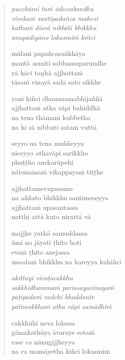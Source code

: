 

\cleartoverso

\vspace*{30mm}

\begin{verse}

\emph{pucchāmi taṁ ādiccabandhu\\
vivekaṁ santipadañca mahesi}\\
\emph{kathaṁ disvā nibbāti bhikkhu\\
anupādiyāno lokasmiṁ kiñci}

mūlaṁ papañcasaṅkhāya\\
mantā asmīti sabbamuparundhe\\
yā kāci taṇhā ajjhattaṁ\\
tāsaṁ vinayā sadā sato sikkhe

yaṁ kiñci dhammamabhijaññā\\
ajjhattaṁ atha vāpi bahiddhā\\
na tena thāmaṁ kubbetha\\
na hi sā nibbuti sataṁ vuttā

seyyo na tena maññeyya\\
nīceyyo athavāpi sarikkho\\
phuṭṭho anekarūpehi\\
nātumānaṁ vikappayaṁ tiṭṭhe

ajjhattamevupasame\\
na aññato bhikkhu santimeseyya\\
ajjhattaṁ upasantassa\\
natthi attā kuto nirattā vā

majjhe yathā samuddassa\\
ūmi no jāyatī ṭhito hoti\\
evaṁ ṭhito anejassa\\
ussadaṁ bhikkhu na kareyya kuhiñci

\emph{akittayī vivaṭacakkhu\\
sakkhidhammaṁ parissayavinayaṁ}\\
\emph{paṭipadaṁ vadehi bhaddante\\
pātimokkhaṁ atha vāpi samādhiṁ}

cakkhūhi neva lolassa\\
gāmakathāya āvaraye sotaṁ\\
rase ca nānugijjheyya\\
na ca mamāyetha kiñci lokasmiṁ


\end{verse}
